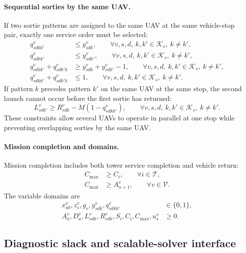 \paragraph{Sequential sorties by the same UAV.}
If two sortie patterns are assigned to the same UAV at the same vehicle-stop pair, exactly one service order must be selected:
\begin{align}
q^v_{sdkk'} &\leq y^v_{sdk},
\qquad \forall v,s,d,\ k,k'\in\mathcal{K}_s,\ k\neq k',
\label{eq:sb-seq-upper-1}\\
q^v_{sdkk'} &\leq y^v_{sdk'},
\qquad \forall v,s,d,\ k,k'\in\mathcal{K}_s,\ k\neq k',
\label{eq:sb-seq-upper-2}\\
q^v_{sdkk'}+q^v_{sdk'k}
&\geq y^v_{sdk}+y^v_{sdk'}-1,
\qquad \forall v,s,d,\ k,k'\in\mathcal{K}_s,\ k\neq k',
\label{eq:sb-seq-lower}\\
q^v_{sdkk'}+q^v_{sdk'k}
&\leq 1,
\qquad \forall v,s,d,\ k,k'\in\mathcal{K}_s,\ k\neq k'.
\label{eq:sb-seq-one-direction}
\end{align}
If pattern \(k\) precedes pattern \(k'\) on the same UAV at the same stop, the second launch cannot occur before the first sortie has returned:
\begin{equation}
L^v_{sdk'}\geq R^v_{sdk}-M(1-q^v_{sdkk'}),
\qquad \forall v,s,d,\ k,k'\in\mathcal{K}_s,\ k\neq k'.
\label{eq:sb-seq-time}
\end{equation}
These constraints allow several UAVs to operate in parallel at one stop while preventing overlapping sorties by the same UAV.

\paragraph{Mission completion and domains.}
Mission completion includes both tower service completion and vehicle return:
\begin{align}
C_{\max}&\geq C_i,
\qquad \forall i\in\mathcal{T},
\label{eq:sb-cmax-tower}\\
C_{\max}&\geq A^v_{n+1},
\qquad \forall v\in\mathcal{V}.
\label{eq:sb-cmax-return}
\end{align}
The variable domains are
\begin{align}
x^v_{ab},z^v_s,g_v,y^v_{sdk},q^v_{sdkk'}
&\in\{0,1\},
\label{eq:sb-binary-domain}\\
A^v_a,D^v_a,L^v_{sdk},R^v_{sdk},S_i,C_i,C_{\max},u^v_s
&\geq 0.
\label{eq:sb-continuous-domain}
\end{align}

\subsection{Diagnostic slack and scalable-solver interface}
\label{sec:model-interface}

